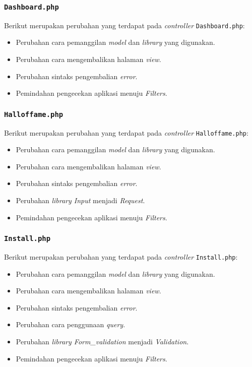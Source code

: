 \subsubsection{\texttt{Dashboard.php}}
Berikut merupakan perubahan yang terdapat pada \textit{controller} \texttt{Dashboard.php}:
\begin{itemize}
	\item Perubahan cara pemanggilan \textit{model} dan \textit{library} yang digunakan.
	\item Perubahan cara mengembalikan halaman \textit{view}.
	\item Perubahan sintaks pengembalian \textit{error}.
	\item Pemindahan pengecekan aplikasi menuju \textit{Filters}.
\end{itemize}
\subsubsection{\texttt{Halloffame.php}}
Berikut merupakan perubahan yang terdapat pada \textit{controller} \texttt{Halloffame.php}:
\begin{itemize}
	\item Perubahan cara pemanggilan \textit{model} dan \textit{library} yang digunakan.
	\item Perubahan cara mengembalikan halaman \textit{view}.
	\item Perubahan sintaks pengembalian \textit{error}.
	\item Perubahan \textit{library Input} menjadi \textit{Request}.
	\item Pemindahan pengecekan aplikasi menuju \textit{Filters}.
\end{itemize}
\subsubsection{\texttt{Install.php}}
Berikut merupakan perubahan yang terdapat pada \textit{controller} \texttt{Install.php}:
\begin{itemize}
	\item Perubahan cara pemanggilan \textit{model} dan \textit{library} yang digunakan.
	\item Perubahan cara mengembalikan halaman \textit{view}.
	\item Perubahan sintaks pengembalian \textit{error}.
	\item Perubahan cara penggunaan \textit{query}.
	\item Perubahan \textit{library Form\_validation} menjadi \textit{Validation}.
	\item Pemindahan pengecekan aplikasi menuju \textit{Filters}.
\end{itemize}
